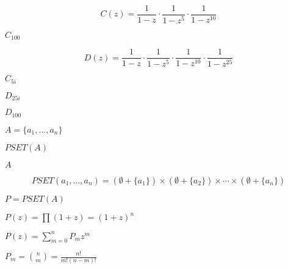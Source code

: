 \documentclass[10pt]{book}
\begin{document}
\begin{mdSnippets}
\begin{mdDisplaySnippet}[73331dc460c1dec712ff7909d2560d75]%
\[%
  C(z) = \frac{1}{1-z}\cdot\frac{1}{1-z^5}\cdot\frac{1}{1-z^{10}}
\]%
\end{mdDisplaySnippet}%
\begin{mdInlineSnippet}[516b2ff426eec68f97c958e36176bc23]%
$C_{100}$\end{mdInlineSnippet}%
\begin{mdDisplaySnippet}[4e3ae1a03cad068df040712311c29259]%
\[%
   D(z) = \frac{1}{1-z}\cdot\frac{1}{1-z^5}\cdot\frac{1}{1-z^{10}}
   \cdot\frac{1}{1-z^{25}}
\]%
\end{mdDisplaySnippet}%
\begin{mdInlineSnippet}[842f823f9d3b002de70da22fbd20df3e]%
$C_{5i}$\end{mdInlineSnippet}%
\begin{mdInlineSnippet}[cd015e20f2c67b077ccecd03f14f972a]%
$D_{25i}$\end{mdInlineSnippet}%
\begin{mdInlineSnippet}[403dc861513703bb6c02401d882ff668]%
$D_{100}$\end{mdInlineSnippet}%
\begin{mdInlineSnippet}[6ab6af6d3b29917fa077422bcdbe8917]%
$A=\{a_1,...,a_n\}$\end{mdInlineSnippet}%
\begin{mdInlineSnippet}%
$PSET(A)$\end{mdInlineSnippet}%
\begin{mdInlineSnippet}[7fc56270e7a70fa81a5935b72eacbe29]%
$A$\end{mdInlineSnippet}%
\begin{mdDisplaySnippet}%
\[%
PSET(a_1,\ldots,a_n) = (\emptyset+\{a_1\})\times(\emptyset+\{a_2\})\times\cdots\times(\emptyset + \{a_n\})
\]%
\end{mdDisplaySnippet}%
\begin{mdInlineSnippet}%
$P=PSET(A)$\end{mdInlineSnippet}%
\begin{mdInlineSnippet}[f5f7fbbfa195fd2927233b3c7907e8ab]%
$P(z)=\prod(1+z)=(1+z)^n$\end{mdInlineSnippet}%
\begin{mdInlineSnippet}[8603ab863c9672a003e2c7d8bfd4978d]%
$P(z)=\sum_{m=0}^nP_m z^m$\end{mdInlineSnippet}%
\begin{mdInlineSnippet}[ee4749c6216413f4bf62fc9a716aa8ae]%
$P_m = {n \choose m}=\frac{n!}{m!(n-m)!}$\end{mdInlineSnippet}%

\end{mdSnippets}
\end{document}

